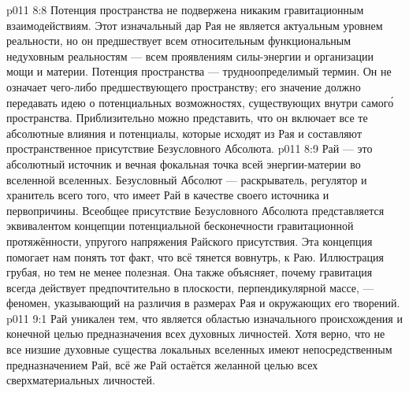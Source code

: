 \vs p011 8:8 \pc Потенция пространства не подвержена никаким гравитационным взаимодействиям. Этот изначальный дар Рая не является актуальным уровнем реальности, но он предшествует всем относительным функциональным недуховным реальностям --- всем проявлениям силы\hyp{}энергии и организации мощи и материи. Потенция пространства --- трудноопределимый термин. Он не означает чего\hyp{}либо предшествующего пространству; его значение должно передавать идею о потенциальных возможностях, существующих внутри самог\'о пространства. Приблизительно можно представить, что он включает все те абсолютные влияния и потенциалы, которые исходят из Рая и составляют пространственное присутствие Безусловного Абсолюта.
\vs p011 8:9 Рай --- это абсолютный источник и вечная фокальная точка всей энергии\hyp{}материи во вселенной вселенных. Безусловный Абсолют --- раскрыватель, регулятор и хранитель всего того, что имеет Рай в качестве своего источника и первопричины. Всеобщее присутствие Безусловного Абсолюта представляется эквивалентом концепции потенциальной бесконечности гравитационной протяжённости, упругого напряжения Райского присутствия. Эта концепция помогает нам понять тот факт, что всё тянется вовнутрь, к Раю. Иллюстрация грубая, но тем не менее полезная. Она также объясняет, почему гравитация всегда действует предпочтительно в плоскости, перпендикулярной массе, --- феномен, указывающий на различия в размерах Рая и окружающих его творений.
\vs p011 9:1 Рай уникален тем, что является областью изначального происхождения и конечной целью предназначения всех духовных личностей. Хотя верно, что не все низшие духовные существа локальных вселенных имеют непосредственным предназначением Рай, всё же Рай остаётся желанной целью всех сверхматериальных личностей.
